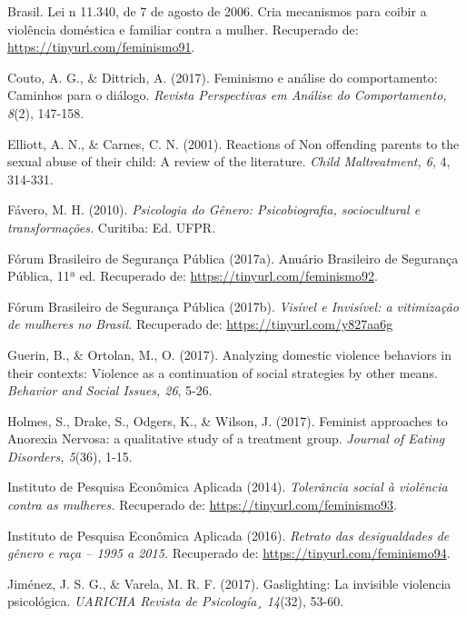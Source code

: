 \hangindent=25pt
\noindent Brasil. Lei n 11.340, de 7 de agosto de 2006. Cria mecanismos para coibir a violência doméstica e familiar contra a mulher. Recuperado de: \url{https://tinyurl.com/feminismo91}. 

\hangindent=25pt
\noindent Couto, A. G., \& Dittrich, A. (2017). Feminismo e análise do comportamento: Caminhos para o diálogo. \textit{Revista Perspectivas em Análise do Comportamento, 8}(2), 147-158.

\hangindent=25pt
\noindent Elliott, A. N., \& Carnes, C. N. (2001). Reactions of Non offending parents to the sexual abuse of their child: A review of the literature. \textit{Child Maltreatment, 6}, 4, 314-331.

\hangindent=25pt
\noindent Fávero, M. H. (2010). \textit{Psicologia do Gênero: Psicobiografia, sociocultural e transformações.} Curitiba: Ed. UFPR.

\hangindent=25pt
\noindent Fórum Brasileiro de Segurança Pública (2017a). Anuário Brasileiro de Segurança Pública, 11ª ed. Recuperado de: \url{https://tinyurl.com/feminismo92}. 

\hangindent=25pt
\noindent Fórum Brasileiro de Segurança Pública (2017b). \textit{Visível e Invisível: a vitimização de mulheres no Brasil.} Recuperado de: \url{https://tinyurl.com/y827aa6g}

\hangindent=25pt
\noindent Guerin, B., \& Ortolan, M., O. (2017). Analyzing domestic violence behaviors in their contexts: Violence as a continuation of social strategies by other means. \textit{Behavior and Social Issues, 26}, 5-26.

\hangindent=25pt
\noindent Holmes, S., Drake, S., Odgers, K., \& Wilson, J. (2017). Feminist approaches to Anorexia Nervosa: a qualitative study of a treatment group. \textit{Journal of Eating Disorders, 5}(36), 1-15.

\hangindent=25pt
\noindent Instituto de Pesquisa Econômica Aplicada (2014). \textit{Tolerância social à violência contra as mulheres.} Recuperado de: \url{https://tinyurl.com/feminismo93}. 

\hangindent=25pt
\noindent Instituto de Pesquisa Econômica Aplicada (2016). \textit{Retrato das desigualdades de gênero e raça – 1995 a 2015.} Recuperado de: \url{https://tinyurl.com/feminismo94}.

\hangindent=25pt
\noindent Jiménez, J. S. G., \& Varela, M. R. F. (2017). Gaslighting: La invisible violencia psicológica. \textit{UARICHA Revista de Psicología¸ 14}(32), 53-60.

